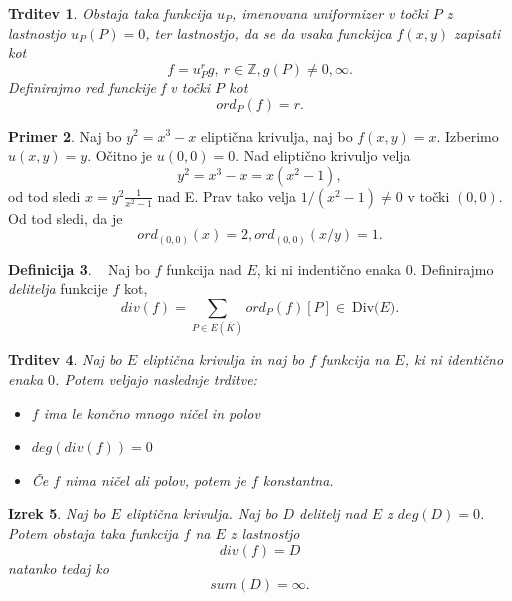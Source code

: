 \documentclass[12pt,a4paper,twoside]{article}
\theoremstyle{definition} %
\newtheorem{definicija}{Definicija}[section]
\newtheorem{primer}[definicija]{Primer}
\theoremstyle{plain} %
\newtheorem{izrek}[definicija]{Izrek}
\newtheorem{trditev}[definicija]{Trditev}
\numberwithin{equation}{section}  %
\newcommand{\Z}{\mathbb Z}
\newcommand{\E}[1]{E({#1})}
\newcommand{\DIV}[1]{\ \text{Div(}{#1}\text{)}}
\begin{document}
\begin{trditev}
Obstaja taka funkcija $u_P$, imenovana \emph{uniformizer} v točki $P$ z lastnostjo $u_P(P) = 0$, ter lastnostjo, da se da vsaka funckijca $f(x,y)$ zapisati kot
$$f = u^r_Pg, \ r\in \Z, g(P) \neq 0,\infty.$$
Definirajmo \emph{red} funckije f v točki $P$ kot
$$ord_P(f)=r.$$
\end{trditev}

\begin{primer}
Naj bo $y^2 = x^3-x$ eliptična krivulja, naj bo $f(x,y) = x$. Izberimo $u(x,y) = y$. Očitno je $u(0,0) = 0$. Nad eliptično krivuljo velja 
$$y^2 = x^3-x = x(x^2-1),$$ 
od tod sledi $x = y^2\frac{1}{x^2-1}$ nad E.
Prav tako velja $1/(x^2-1) \neq 0$ v točki $(0,0)$. Od tod sledi, da je 
$$ord_{(0,0)}(x) = 2, ord_{(0,0)}(x/y) = 1.$$
\end{primer}

\begin{definicija}~
Naj bo $f$ funkcija nad $E$, ki ni indentično enaka $0$. Definirajmo \emph{delitelja} funkcije $f$ kot,
$$div(f) = \sum_{P\in \E{\overline{K}}} ord_P(f)[P] \in \DIV{E}.$$
\end{definicija}


\begin{trditev}
\label{trditev 11.1}
Naj bo $E$ eliptična krivulja in naj bo $f$ funkcija na $E$, ki ni identično enaka $0$. Potem veljajo naslednje trditve:
\begin{itemize}

\item $f$ ima le končno mnogo ničel in polov
\item $deg(div(f))=0$
\item Če $f$ nima ničel ali polov, potem je $f$ konstantna.
\end{itemize}


\end{trditev}

\begin{izrek}
\label{izrek 11.2}
Naj bo $E$ eliptična krivulja. Naj bo $D$ delitelj nad $E$ z $deg(D) = 0$. Potem obstaja taka funkcija $f$ na $E$ z lastnostjo
$$div(f) = D$$
natanko tedaj ko
$$sum(D) = \infty.$$

\end{izrek}
\end{document}
